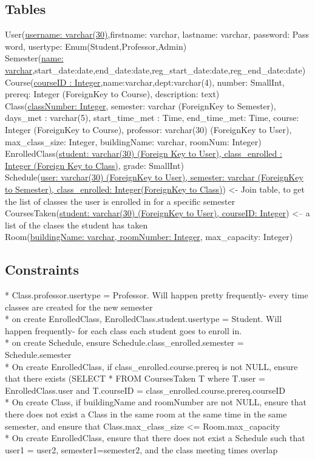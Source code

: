\documentclass[11pt,oneside,a4paper]{article}
\begin{document}
\subsection{Tables}
User(\underline{username: varchar(30)},firstname: varchar, lastname: varchar,
password: Pass	word, usertype: Enum(Student,Professor,Admin)
\\
Semester(\underline{name:
varchar},start\_date:date,end\_date:date,reg\_start\_date:date,reg\_end\_date:date)
\\
Course(\underline{courseID	: Integer},name:varchar,dept:varchar(4), number:
SmallInt, prereq: Integer (ForeignKey to Course), description: text)
\\
Class(\underline{classNumber: Integer}, semester: varchar (ForeignKey to
Semester), days\_met : varchar(5), start\_time\_met : Time, end\_time\_met:
Time, course: Integer (ForeignKey to Course), professor: varchar(30)
(ForeignKey to User), max\_class\_size: Integer, buildingName: varchar,
roomNum: Integer)
\\
EnrolledClass(\underline{student: varchar(30) (Foreign Key to User),
class\_enrolled : Integer (Foreign Key to Class)}, grade: SmallInt)
\\
Schedule(\underline{user: varchar(30) (ForeignKey to User), semester: varchar
(ForeignKey to Semester), class\_enrolled: Integer(ForeignKey to Class)}) <-
Join table, to get the list of classes the user is enrolled in for a specific
semester
\\
CoursesTaken(\underline{student: varchar(30) (ForeignKey to User), courseID:
Integer}) <-- a list of the clases the student has taken\\
Room(\underline{buildingName: varchar, roomNumber: Integer}, max\_capacity:
Integer)
\subsection{Constraints}
	* Class.professor.usertype = Professor. Will happen pretty
	frequently- every time classes are created for the new semester\\
	* on create EnrolledClass, EnrolledClass.student.usertype = Student. Will
	happen frequently- for each class each student goes to enroll in.\\
	* on create Schedule, ensure Schedule.class\_enrolled.semester =
	Schedule.semester\\
	* On create EnrolledClass, if class\_enrolled.course.prereq is not NULL, ensure
	that there exists (SELECT * FROM CoursesTaken T where T.user =
	EnrolledClass.user and T.courseID =
	class\_enrolled.course.prereq.courseID\\
	* On create Class, if buildingName and roomNumber are not NULL, ensure that
	there does not exist a Class in the same room at the same time in the same
	semester, and ensure that Class.max\_class\_size <= Room.max\_capacity \\
	* On create EnrolledClass, ensure that there does not exist a Schedule such
	that user1 = user2, semester1=semester2, and the class meeting times
	overlap
\end{document}
